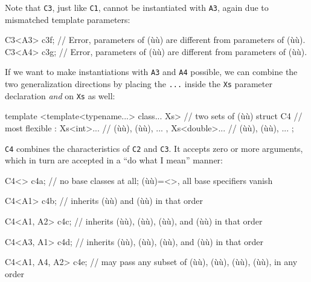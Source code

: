 \noindent Note that \lstinline!C3!, just like \lstinline!C1!, cannot be instantiated
with \lstinline!A3!, again due to mismatched template parameters:

\begin{emcppslisting}
C3<A3> c3f;
    // Error, parameters of (ù{}ù) are different from parameters of (ù{}ù).
C3<A4> c3g;
    // Error, parameters of (ù{}ù) are different from parameters of (ù{}ù).
\end{emcppslisting}
    

\noindent If we want to make instantiations with \lstinline!A3! and \lstinline!A4!
possible, we can combine the two generalization directions by placing
the \lstinline!...! inside the \lstinline!Xs! parameter declaration \emph{and}
on \lstinline!Xs! as well:

\begin{emcppslisting}
template <template<typename...> class... Xs>  // two sets of (ù{}ù)
struct C4                                     // most flexible
    : Xs<int>...                              // (ù{}ù), (ù{}ù), ...
    , Xs<double>...                           // (ù{}ù), (ù{}ù), ...
{ };
\end{emcppslisting}
    

\noindent \lstinline!C4! combines the characteristics of \lstinline!C2! and \lstinline!C3!.
It accepts zero or more arguments, which in turn are accepted in a ``do
what I mean'' manner:

\begin{emcppslisting}
C4<>           c4a;
    // no base classes at all; (ù{}ù)=<>, all base specifiers vanish

C4<A1>         c4b;
    // inherits (ù{}ù) and (ù{}ù) in that order

C4<A1, A2>     c4c;
    // inherits (ù{}ù), (ù{}ù), (ù{}ù), and (ù{}ù) in that order

C4<A3, A1>     c4d;
    // inherits (ù{}ù), (ù{}ù), (ù{}ù), and (ù{}ù) in that order

C4<A1, A4, A2> c4e;
    // may pass any subset of (ù{}ù), (ù{}ù), (ù{}ù), (ù{}ù), in any order
\end{emcppslisting}
    

